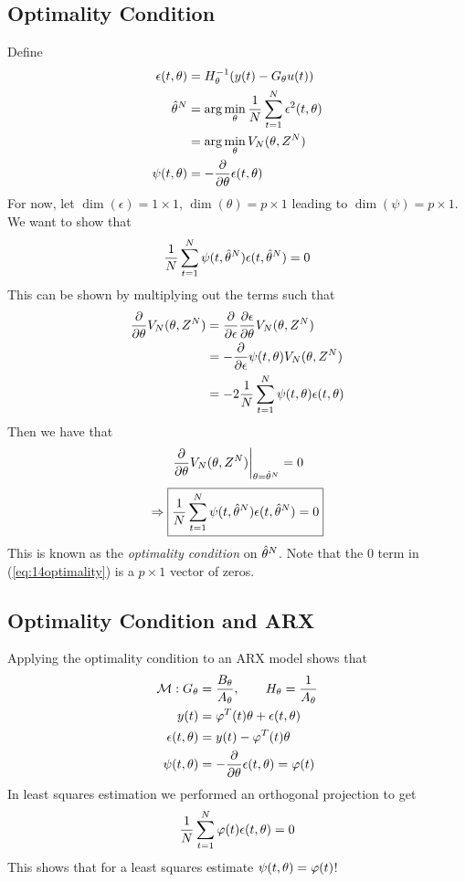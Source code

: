 \subsection{Optimality Condition}
Define
\begin{align*}
\epsilon(t,\theta) &= H_\theta^{-1}(y(t)-G_\theta u(t)) \\
\hat{\theta}^N &= \arg\min_\theta\frac{1}{N}\sum_{t=1}^N\epsilon^2(t,\theta) \\
&= \arg\min_\theta V_N(\theta,Z^N) \\
\psi(t,\theta) &= -\frac{\partial}{\partial\theta}\epsilon(t,\theta)
\end{align*}
For now, let $\dim(\epsilon)=1\times1$, $\dim(\theta)=p\times1$ leading to $\dim(\psi)=p\times1$.
We want to show that
\begin{align*}
\frac{1}{N}\sum_{t=1}^N\psi(t,\hat{\theta}^N)\epsilon(t,\hat{\theta}^N) = 0
\end{align*}
This can be shown by multiplying out the terms such that
\begin{align*}
\frac{\partial}{\partial\theta}V_N(\theta,Z^N) &= \frac{\partial}{\partial\epsilon}\frac{\partial\epsilon}{\partial\theta}V_N(\theta,Z^N) \\
&= -\frac{\partial}{\partial\epsilon}\psi(t,\theta)V_N(\theta,Z^N) \\
&= -2\frac{1}{N}\sum_{t=1}^N\psi(t,\theta)\epsilon(t,\theta)
\end{align*}
Then we have that
\begin{align*}
\left.\frac{\partial}{\partial\theta}V_N(\theta,Z^N)\right|_{\theta=\hat{\theta}^N} = 0 \\
\end{align*}
\begin{align}
\label{eq:14optimality}
\Rightarrow \boxed{\frac{1}{N}\sum_{t=1}^N\psi(t,\hat{\theta}^N)\epsilon(t,\hat{\theta}^N) = 0}
\end{align}
This is known as the \textit{optimality condition} on $\hat{\theta}^N$.
Note that the $0$ term in (\ref{eq:14optimality}) is a $p\times1$ vector of zeros.

\subsection{Optimality Condition and ARX}
Applying the optimality condition to an ARX model shows that
\begin{align*}
\mathcal{M}: G_\theta&=\frac{B_\theta}{A_\theta}, \qquad H_\theta=\frac{1}{A_\theta} \\
y(t)&= \varphi^T(t)\theta+\epsilon(t,\theta) \\
\epsilon(t,\theta) &= y(t)-\varphi^T(t)\theta \\
\psi(t,\theta) &= -\frac{\partial}{\partial\theta}\epsilon(t,\theta) = \varphi(t)
\end{align*}
In least squares estimation we performed an orthogonal projection to get
\begin{align*}
\frac{1}{N}\sum_{t=1}^N\varphi(t)\epsilon(t,\theta) = 0
\end{align*}
This shows that for a least squares estimate $\psi(t,\theta) = \varphi(t)$!

